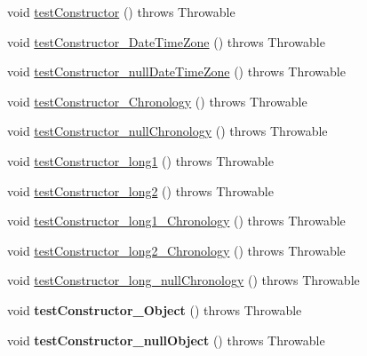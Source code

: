 \begin{DoxyCompactItemize}
\item 
void \hyperlink{classorg_1_1joda_1_1time_1_1_test_month_day___constructors_aec75a10604c4f1fea2693a8ca09ff001}{test\-Constructor} ()  throws Throwable 
\item 
void \hyperlink{classorg_1_1joda_1_1time_1_1_test_month_day___constructors_a1586f2420826634fc96f0d831773fa98}{test\-Constructor\-\_\-\-Date\-Time\-Zone} ()  throws Throwable 
\item 
void \hyperlink{classorg_1_1joda_1_1time_1_1_test_month_day___constructors_a94c4e15424a4ca8bb04e4e0af341defc}{test\-Constructor\-\_\-null\-Date\-Time\-Zone} ()  throws Throwable 
\item 
void \hyperlink{classorg_1_1joda_1_1time_1_1_test_month_day___constructors_a111c862d0c5abafbd9f81755da8465f8}{test\-Constructor\-\_\-\-Chronology} ()  throws Throwable 
\item 
void \hyperlink{classorg_1_1joda_1_1time_1_1_test_month_day___constructors_a0a5d3ac4797d6ab7a32b19112b204308}{test\-Constructor\-\_\-null\-Chronology} ()  throws Throwable 
\item 
void \hyperlink{classorg_1_1joda_1_1time_1_1_test_month_day___constructors_adf627bb7a5a0f88a60be40809faabfde}{test\-Constructor\-\_\-long1} ()  throws Throwable 
\item 
void \hyperlink{classorg_1_1joda_1_1time_1_1_test_month_day___constructors_ab1ef2f3332388fad843a54d8e1801cf9}{test\-Constructor\-\_\-long2} ()  throws Throwable 
\item 
void \hyperlink{classorg_1_1joda_1_1time_1_1_test_month_day___constructors_a70a8ed0b11c978c0bf4d74d40780b28a}{test\-Constructor\-\_\-long1\-\_\-\-Chronology} ()  throws Throwable 
\item 
void \hyperlink{classorg_1_1joda_1_1time_1_1_test_month_day___constructors_aa369c54bd141502e4bb9c788aab3e7be}{test\-Constructor\-\_\-long2\-\_\-\-Chronology} ()  throws Throwable 
\item 
void \hyperlink{classorg_1_1joda_1_1time_1_1_test_month_day___constructors_a268f9a22f1b41651dc509c9977fdebe7}{test\-Constructor\-\_\-long\-\_\-null\-Chronology} ()  throws Throwable 
\item 
\hypertarget{classorg_1_1joda_1_1time_1_1_test_month_day___constructors_adf6603deed57f0f29c57b0ecc37b8a7f}{void {\bfseries test\-Constructor\-\_\-\-Object} ()  throws Throwable }\label{classorg_1_1joda_1_1time_1_1_test_month_day___constructors_adf6603deed57f0f29c57b0ecc37b8a7f}

\item 
\hypertarget{classorg_1_1joda_1_1time_1_1_test_month_day___constructors_a717efae432a286633ea361567a9534c9}{void {\bfseries test\-Constructor\-\_\-null\-Object} ()  throws Throwable }\label{classorg_1_1joda_1_1time_1_1_test_month_day___constructors_a717efae432a286633ea361567a9534c9}


\end{DoxyCompactItemize}
